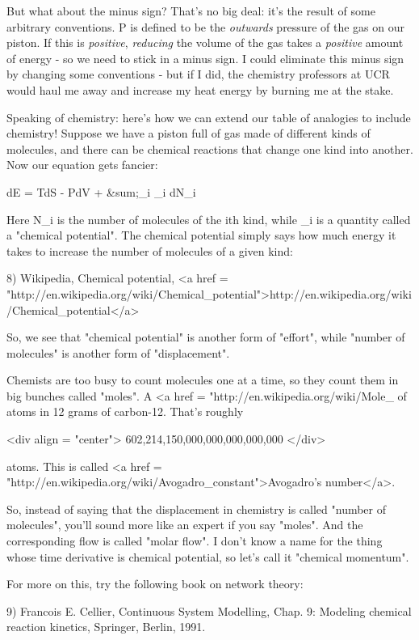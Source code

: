 But what about the minus sign?  That's no big deal: it's the result of
some arbitrary conventions.  P is defined to be the \emph{outwards}
pressure of the gas on our piston.  If this is \emph{positive},
\emph{reducing} the volume of the gas takes a \emph{positive}
amount of energy - so we need to stick in a minus sign.  I could
eliminate this minus sign by changing some conventions - but if I did,
the chemistry professors at UCR would haul me away and increase my
heat energy by burning me at the stake.

Speaking of chemistry: here's how we can extend our table of analogies
to include chemistry!  Suppose we have a piston full of gas made of
different kinds of molecules, and there can be chemical reactions that
change one kind into another.  Now our equation gets fancier:

dE = TdS - PdV + &sum;_{i} \mu _{i} dN_{i}

Here N_{i} is the number of molecules of the ith kind, while
\mu _{i} is a quantity called a "chemical potential".
The chemical potential simply says how much energy it takes to
increase the number of molecules of a given kind:

8) Wikipedia, Chemical potential, 
<a href = "http://en.wikipedia.org/wiki/Chemical_potential">http://en.wikipedia.org/wiki/Chemical_potential</a>

So, we see that "chemical potential" is another form of
"effort", while "number of molecules" is another
form of "displacement".

Chemists are too busy to count molecules one at a time, so they count
them in big bunches called "moles".  A <a href =
"http://en.wikipedia.org/wiki/Mole_%
of atoms in 12 grams of carbon-12.  That's roughly

<div align = "center">
                 602,214,150,000,000,000,000,000
</div>

atoms.  This is called <a href =
"http://en.wikipedia.org/wiki/Avogadro_constant">Avogadro's
number</a>.

So, instead of saying that the displacement in chemistry is called
"number of molecules", you'll sound more like an expert if
you say "moles".  And the corresponding flow is called
"molar flow".  I don't know a name for the thing whose time
derivative is chemical potential, so let's call it "chemical
momentum".

For more on this, try the following book on network theory:

9) Francois E. Cellier, Continuous System Modelling, Chap. 9: Modeling
chemical reaction kinetics, Springer, Berlin, 1991.

